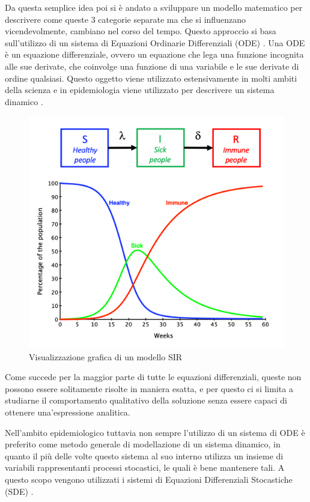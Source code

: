 Da questa semplice idea poi si è andato a sviluppare un modello
matematico per descrivere come queste 3 categorie separate ma 
che si influenzano vicendevolmente, cambiano nel corso del tempo.
Questo approccio si basa sull'utilizzo di un sistema di Equazioni 
Ordinarie Differenziali (ODE) \cite{Brauer2008}. Una ODE è
un equazione differenziale, ovvero un equazione che lega 
una funzione incognita alle sue derivate, che coinvolge una 
funzione di una variabile e le sue derivate di ordine qualsiasi.
Questo oggetto viene utilizzato estensivamente in molti ambiti 
della scienza e in epidemiologia viene utilizzato per 
descrivere un sistema dinamico \cite{wiki:Equazione_differenziale_ordinaria}. 

\begin{figure}[h]
    \includegraphics[width=\linewidth]{img/SIR-model.png}
    \caption{Visualizzazione grafica di un modello SIR} 
    \label{fig:SIR_model_graphic}
\end{figure}

Come succede per la maggior parte di tutte le equazioni 
differenziali, queste non possono essere solitamente 
risolte in maniera esatta, e per questo ci si limita a 
studiarne il comportamento qualitativo della soluzione 
senza essere capaci di ottenere una'espressione analitica.

Nell'ambito epidemiologico tuttavia non sempre l'utilizzo
di un sistema di ODE è preferito come metodo generale di 
modellazione di un sistema dinamico, in quanto il più 
delle volte questo sistema al suo interno utilizza un 
insieme di variabili rappresentanti processi stocastici, le quali 
è bene mantenere tali. A questo scopo vengono utilizzati i 
sistemi di Equazioni Differenziali Stocastiche (SDE) \cite{Allen2008}.

